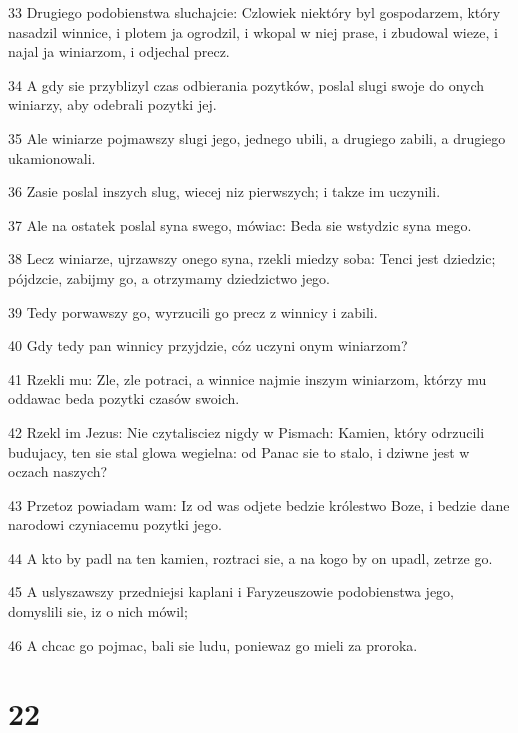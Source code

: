 \par 33 Drugiego podobienstwa sluchajcie: Czlowiek niektóry byl gospodarzem, który nasadzil winnice, i plotem ja ogrodzil, i wkopal w niej prase, i zbudowal wieze, i najal ja winiarzom, i odjechal precz.
\par 34 A gdy sie przyblizyl czas odbierania pozytków, poslal slugi swoje do onych winiarzy, aby odebrali pozytki jej.
\par 35 Ale winiarze pojmawszy slugi jego, jednego ubili, a drugiego zabili, a drugiego ukamionowali.
\par 36 Zasie poslal inszych slug, wiecej niz pierwszych; i takze im uczynili.
\par 37 Ale na ostatek poslal syna swego, mówiac: Beda sie wstydzic syna mego.
\par 38 Lecz winiarze, ujrzawszy onego syna, rzekli miedzy soba: Tenci jest dziedzic; pójdzcie, zabijmy go, a otrzymamy dziedzictwo jego.
\par 39 Tedy porwawszy go, wyrzucili go precz z winnicy i zabili.
\par 40 Gdy tedy pan winnicy przyjdzie, cóz uczyni onym winiarzom?
\par 41 Rzekli mu: Zle, zle potraci, a winnice najmie inszym winiarzom, którzy mu oddawac beda pozytki czasów swoich.
\par 42 Rzekl im Jezus: Nie czytalisciez nigdy w Pismach: Kamien, który odrzucili budujacy, ten sie stal glowa wegielna: od Panac sie to stalo, i dziwne jest w oczach naszych?
\par 43 Przetoz powiadam wam: Iz od was odjete bedzie królestwo Boze, i bedzie dane narodowi czyniacemu pozytki jego.
\par 44 A kto by padl na ten kamien, roztraci sie, a na kogo by on upadl, zetrze go.
\par 45 A uslyszawszy przedniejsi kaplani i Faryzeuszowie podobienstwa jego, domyslili sie, iz o nich mówil;
\par 46 A chcac go pojmac, bali sie ludu, poniewaz go mieli za proroka.

\chapter{22}


